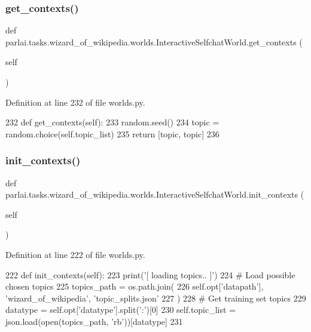 \subsubsection{\texorpdfstring{get\+\_\+contexts()}{get\_contexts()}}
{\footnotesize\ttfamily def parlai.\+tasks.\+wizard\+\_\+of\+\_\+wikipedia.\+worlds.\+Interactive\+Selfchat\+World.\+get\+\_\+contexts (\begin{DoxyParamCaption}\item[{}]{self }\end{DoxyParamCaption})}



Definition at line 232 of file worlds.\+py.


\begin{DoxyCode}
232     \textcolor{keyword}{def }get\_contexts(self):
233         random.seed()
234         topic = random.choice(self.topic\_list)
235         \textcolor{keywordflow}{return} [topic, topic]
236 \end{DoxyCode}
\mbox{\label{classparlai_1_1tasks_1_1wizard__of__wikipedia_1_1worlds_1_1InteractiveSelfchatWorld_a7c8bb5adb1d2d5a94852dd205457dc6b}} 
\subsubsection{\texorpdfstring{init\+\_\+contexts()}{init\_contexts()}}
{\footnotesize\ttfamily def parlai.\+tasks.\+wizard\+\_\+of\+\_\+wikipedia.\+worlds.\+Interactive\+Selfchat\+World.\+init\+\_\+contexts (\begin{DoxyParamCaption}\item[{}]{self }\end{DoxyParamCaption})}



Definition at line 222 of file worlds.\+py.


\begin{DoxyCode}
222     \textcolor{keyword}{def }init\_contexts(self):
223         print(\textcolor{stringliteral}{'[ loading topics.. ]'})
224         \textcolor{comment}{# Load possible chosen topics}
225         topics\_path = os.path.join(
226             self.opt[\textcolor{stringliteral}{'datapath'}], \textcolor{stringliteral}{'wizard\_of\_wikipedia'}, \textcolor{stringliteral}{'topic\_splits.json'}
227         )
228         \textcolor{comment}{# Get training set topics}
229         datatype = self.opt[\textcolor{stringliteral}{'datatype'}].split(\textcolor{stringliteral}{':'})[0]
230         self.topic\_list = json.load(open(topics\_path, \textcolor{stringliteral}{'rb'}))[datatype]
231 
\end{DoxyCode}



